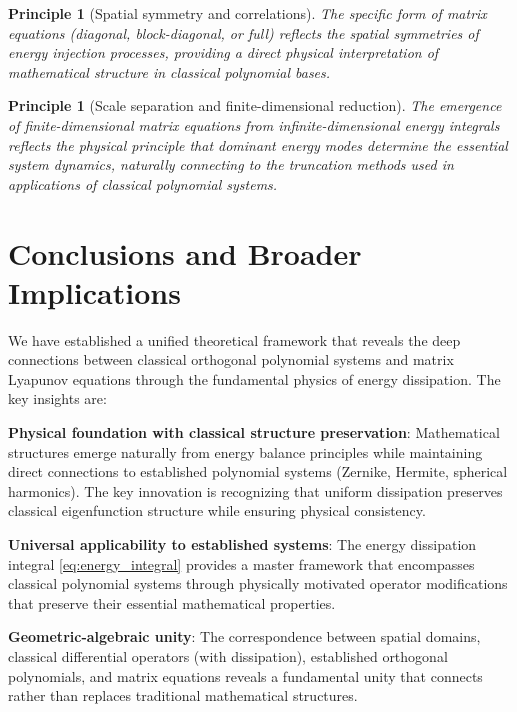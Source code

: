 \documentclass[a4paper,12pt]{article}
\newtheorem{principle}[theorem]{Principle}
\begin{document}
\begin{principle}[Spatial symmetry and correlations]\label{prin:symmetry}
The specific form of matrix equations (diagonal, block-diagonal, or full) reflects the spatial symmetries of energy injection processes, providing a direct physical interpretation of mathematical structure in classical polynomial bases.
\end{principle}

\begin{principle}[Scale separation and finite-dimensional reduction]\label{prin:scale}
The emergence of finite-dimensional matrix equations from infinite-dimensional energy integrals reflects the physical principle that dominant energy modes determine the essential system dynamics, naturally connecting to the truncation methods used in applications of classical polynomial systems.
\end{principle}

\section{Conclusions and Broader Implications}\label{sec:conclusions}

We have established a unified theoretical framework that reveals the deep connections between classical orthogonal polynomial systems and matrix Lyapunov equations through the fundamental physics of energy dissipation. The key insights are:

\textbf{Physical foundation with classical structure preservation}: Mathematical structures emerge naturally from energy balance principles while maintaining direct connections to established polynomial systems (Zernike, Hermite, spherical harmonics). The key innovation is recognizing that uniform dissipation preserves classical eigenfunction structure while ensuring physical consistency.

\textbf{Universal applicability to established systems}: The energy dissipation integral \eqref{eq:energy_integral} provides a master framework that encompasses classical polynomial systems through physically motivated operator modifications that preserve their essential mathematical properties.

\textbf{Geometric-algebraic unity}: The correspondence between spatial domains, classical differential operators (with dissipation), established orthogonal polynomials, and matrix equations reveals a fundamental unity that connects rather than replaces traditional mathematical structures.
\end{document}
